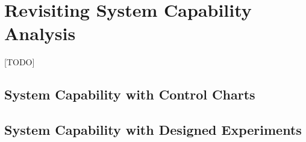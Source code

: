 \documentclass[12pt,a4paper]{report}
\begin{document}














\chapter{Revisiting System Capability Analysis}
\label{sec:advanced_capability_analysis}
[TODO]
\section{System Capability with Control Charts}
\section{System Capability with Designed Experiments}




\newpage

\appendix







\newpage
{}

%

%
\label{sec:bibliography}
\end{document}
